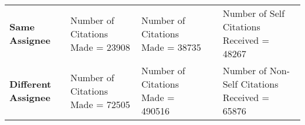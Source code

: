 \begin{sidewaystable}[htbp]
\begin{tabular}{|p{8.085em}|p{8.335em}|p{8.665em}|l|l|}
\cmidrule{1-3}\cmidrule{5-5}    \rowcolor[rgb]{ .988,  .894,  .839} \textbf{Same Assignee} & \cellcolor[rgb]{ .867,  .922,  .969}Number of Citations Made = 23908 & \cellcolor[rgb]{ .867,  .922,  .969}Number of Citations Made = 38735 &       & \cellcolor[rgb]{ 1,  .949,  .8}Number of Self Citations Received = 48267 \\
\cmidrule{1-3}\cmidrule{5-5}    \rowcolor[rgb]{ .988,  .894,  .839} \textbf{Different Assignee} & \cellcolor[rgb]{ .867,  .922,  .969}Number of Citations Made = 72505 & \cellcolor[rgb]{ .867,  .922,  .969}Number of Citations Made = 490516 &       & \cellcolor[rgb]{ 1,  .949,  .8}Number of Non-Self Citations Received = 65876 \\
    \bottomrule
\end{tabular}
\end{sidewaystable}
